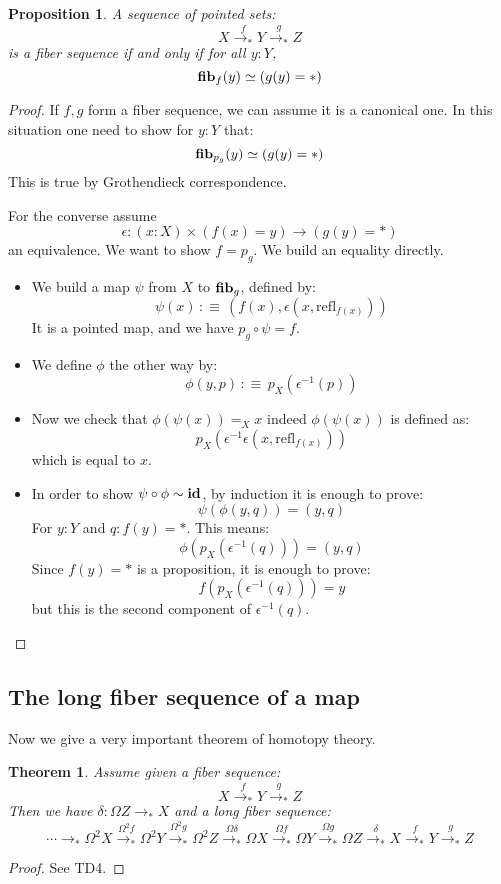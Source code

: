\documentclass{article}
\newcommand{\sse}[1]{\medbreak \subsection{#1}}
\renewcommand{\r}{\rightarrow}
\newcommand{\refl}{\mathrm{refl}}
\newcommand{\id}{\mathrm{\bf id}}
\newcommand{\fib}{\mathrm{\bf fib}}
\newtheorem{proposition}{Proposition}
\newtheorem{theorem}{Theorem}
\begin{document}
\begin{proposition}
A sequence of pointed sets:
\[X \overset{f}{\r_*} Y\overset{g}{\r_*} Z\] 
is a fiber sequence if and only if for all $y:Y$, 
\[\fib_f(y)\simeq (g(y)=*) \]
\end{proposition}
\begin{proof}
If $f,g$ form a fiber sequence, we can assume it is a canonical one. In this situation one need to show for $y:Y$ that:
\[\fib_{p_g}(y)\simeq(g(y)=*)\]
This is true by Grothendieck correspondence.

For the converse assume 
\[\epsilon : (x:X)\times (f(x)=y)\r  (g(y)=*) \]
an equivalence. We want to show $f = p_g$. We build an equality directly. 
\begin{itemize}
\item We build a map $\psi$ from $X$ to $\fib_g$, defined by:
\[\psi(x) \, :\equiv\, (f(x),\epsilon(x,\refl_{f(x)}))\]
It is a pointed map, and we have $p_g\circ \psi = f$.
\item We define $\phi$ the other way by:
\[\phi(y,p) \, :\equiv\, p_X(\epsilon^{-1}(p))\]
\item Now we check that $\phi(\psi(x)) =_X x$ indeed $\phi(\psi(x))$ is defined as:
\[p_X(\epsilon^{-1}\epsilon(x,\refl_{f(x)}))\]
which is equal to $x$.
\item In order to show $\psi\circ\phi \sim \id$, by induction it is enough to prove:
\[\psi(\phi(y,q)) = (y,q)\]
For $y:Y$ and $q:f(y)=*$. This means:
\[\phi(p_X(\epsilon^{-1}(q))) = (y,q)\]
Since $f(y)=*$ is a proposition, it is enough to prove:
\[f(p_X(\epsilon^{-1}(q))) = y\]
but this is the second component of $\epsilon^{-1}(q)$.
\end{itemize}
\end{proof}


\sse{The long fiber sequence of a map}

Now we give a very important theorem of homotopy theory.

\begin{theorem}
Assume given a fiber sequence:
\[X \overset{f}{\r_*} Y\overset{g}{\r_*} Z\] 
Then we have $\delta : \Omega Z\r_* X$ and a long fiber sequence:
\[\cdots \r_* \Omega^2 X \overset{\Omega^2 f}{\r_*} \Omega^2 Y \overset{\Omega^2 g}{\r_*}\Omega^2 Z \overset{\Omega\delta}{\r_*} \Omega X \overset{\Omega f}{\r_*} \Omega Y \overset{\Omega g}{\r_*} \Omega Z \overset{\delta}{\r_*} X \overset{f}{\r_*} Y\overset{g}{\r_*} Z  \]
\end{theorem}
\begin{proof}
See TD4.
\end{proof}
\end{document}
